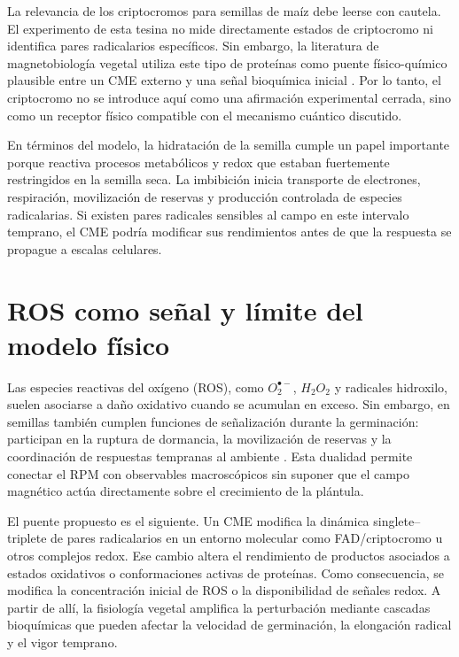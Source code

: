 La relevancia de los criptocromos para semillas de maíz debe leerse con cautela. El experimento de esta tesina no mide directamente estados de criptocromo ni identifica pares radicalarios específicos. Sin embargo, la literatura de magnetobiología vegetal utiliza este tipo de proteínas como puente físico-químico plausible entre un CME externo y una señal bioquímica inicial \cite{maffei_2022,sarraf_2020}. Por lo tanto, el criptocromo no se introduce aquí como una afirmación experimental cerrada, sino como un receptor físico compatible con el mecanismo cuántico discutido.

En términos del modelo, la hidratación de la semilla cumple un papel importante porque reactiva procesos metabólicos y redox que estaban fuertemente restringidos en la semilla seca. La imbibición inicia transporte de electrones, respiración, movilización de reservas y producción controlada de especies radicalarias. Si existen pares radicales sensibles al campo en este intervalo temprano, el CME podría modificar sus rendimientos antes de que la respuesta se propague a escalas celulares.

\section{ROS como señal y límite del modelo físico}

Las especies reactivas del oxígeno (ROS), como $O_{2}^{\bullet-}$, $H_{2}O_{2}$ y radicales hidroxilo, suelen asociarse a daño oxidativo cuando se acumulan en exceso. Sin embargo, en semillas también cumplen funciones de señalización durante la germinación: participan en la ruptura de dormancia, la movilización de reservas y la coordinación de respuestas tempranas al ambiente \cite{shine_2017,kataria_2017,araujo_2016}. Esta dualidad permite conectar el RPM con observables macroscópicos sin suponer que el campo magnético actúa directamente sobre el crecimiento de la plántula.

El puente propuesto es el siguiente. Un CME modifica la dinámica singlete--triplete de pares radicalarios en un entorno molecular como FAD/criptocromo u otros complejos redox. Ese cambio altera el rendimiento de productos asociados a estados oxidativos o conformaciones activas de proteínas. Como consecuencia, se modifica la concentración inicial de ROS o la disponibilidad de señales redox. A partir de allí, la fisiología vegetal amplifica la perturbación mediante cascadas bioquímicas que pueden afectar la velocidad de germinación, la elongación radical y el vigor temprano.

